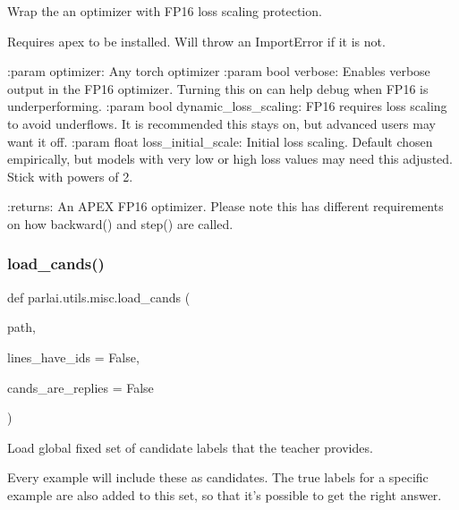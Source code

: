 \begin{DoxyVerb}Wrap the an optimizer with FP16 loss scaling protection.

Requires apex to be installed. Will throw an ImportError if it is not.

:param optimizer:
    Any torch optimizer
:param bool verbose:
    Enables verbose output in the FP16 optimizer. Turning this on can help
    debug when FP16 is underperforming.
:param bool dynamic_loss_scaling:
    FP16 requires loss scaling to avoid underflows. It is recommended this
    stays on, but advanced users may want it off.
:param float loss_initial_scale:
    Initial loss scaling. Default chosen empirically, but models with very low
    or high loss values may need this adjusted. Stick with powers of 2.

:returns:
    An APEX FP16 optimizer. Please note this has different requirements on
    how backward() and step() are called.
\end{DoxyVerb}
 \mbox{\label{namespaceparlai_1_1utils_1_1misc_ad935ab0a9d49b897c5e3efdbe1c46c4d}} 
\subsubsection{\texorpdfstring{load\+\_\+cands()}{load\_cands()}}
{\footnotesize\ttfamily def parlai.\+utils.\+misc.\+load\+\_\+cands (\begin{DoxyParamCaption}\item[{}]{path,  }\item[{}]{lines\+\_\+have\+\_\+ids = {\ttfamily False},  }\item[{}]{cands\+\_\+are\+\_\+replies = {\ttfamily False} }\end{DoxyParamCaption})}

\begin{DoxyVerb}Load global fixed set of candidate labels that the teacher provides.

Every example will include these as candidates. The true labels for a specific
example are also added to this set, so that it's possible to get the right answer.
\end{DoxyVerb}
 \mbox{\label{namespaceparlai_1_1utils_1_1misc_a7c97ef3250327bc549ac652a481be0cf}} 
